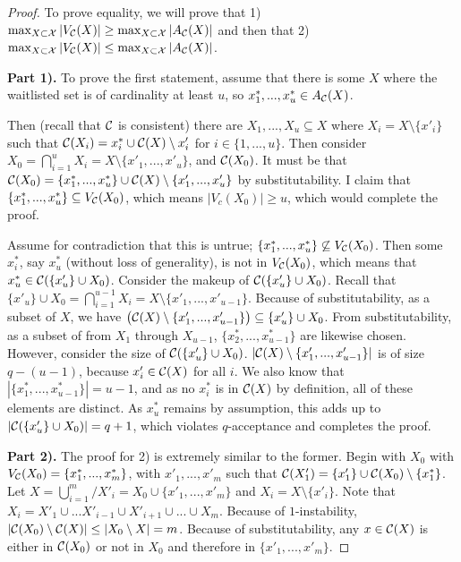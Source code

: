 \begin{proof}
To prove equality, we will prove that 1) $\max_{X\subset \mathcal{X}} \left| V_{\mathcal{C}}(X)\right| \geq \max_{X\subset \mathcal{X}} \left| A_{\mathcal{C}}(X)\right|$ and then that 2) $\max_{X\subset \mathcal{X}} \left| V_{\mathcal{C}}(X)\right| \leq  \max_{X\subset \mathcal{X}} \left| A_{\mathcal{C}}(X)\right|$.

\textbf{Part 1).}
To prove the first statement, assume that there is some $X$ where the waitlisted set is of cardinality at least $u$, so $x^*_1, ..., x^*_u \in A_{\mathcal{C}}(X)$.

Then (recall that $\mathcal{C}$ is consistent) there are $X_1, ..., X_u \subseteq X$ where $X_i = X \setminus \{x'_i\}$ such that $\mathcal{C}(X_i) = x^*_i \cup \mathcal{C}(X) \setminus x'_i$ for $i \in \{1, ..., u\}$. Then consider $X_0 = \bigcap_{i=1}^u X_i = X \setminus \{x'_1, ..., x'_u\}$, and $\mathcal{C}(X_0)$. It must be that $\mathcal{C}(X_0) = \{x^*_1, ..., x^*_u\} \cup \mathcal{C}(X) \setminus \{x'_1, ..., x'_u\}$ by substitutability. I claim that $\{x^*_1, ..., x^*_u\} \subseteq V_{\mathcal{C}}(X_0)$, which means $|V_c(X_0)| \geq u$, which would complete the proof.

Assume for contradiction that this is untrue; $\{x^*_1, ..., x^*_u\} \not\subseteq V_{\mathcal{C}}(X_0)$. Then some $x^*_i$, say $x^*_u$ (without loss of generality), is not in $V_{\mathcal{C}}(X_0)$, which means that $x^*_u \in \mathcal{C}(\{x'_u\} \cup X_0)$.
Consider the makeup of $\mathcal{C}(\{x'_u\} \cup X_0)$. Recall that $\{x'_u\} \cup X_0 = \bigcap_{i=1}^{u-1} X_i = X \setminus \{x'_1, ..., x'_{u-1}\}$. Because of substitutability, as a subset of $X$, we have $\left(\mathcal{C}(X) \setminus \{x'_1, ..., x'_{u-1}\}\right) \subseteq \{x'_u\} \cup X_0$. From substitutability, as a subset of from $X_1$ through $X_{u-1}$, $\{x^*_2, ..., x^*_{u-1}\}$ are likewise chosen.
However, consider the size of $\mathcal{C}(\{x'_u\} \cup X_0)$. $|\mathcal{C}(X) \setminus \{x'_1, ..., x'_{u-1}\}|$ is of size $q-(u-1)$, because $x'_i \in \mathcal{C}(X)$ for all $i$. We also know that $|\{x^*_1, ..., x^*_{u-1}\}| = u-1$, and as no  $x^*_i$ is in $\mathcal{C}(X)$ by definition, all of these elements are distinct. As $x^*_u$ remains by assumption, this adds up to $|\mathcal{C}(\{x'_u\} \cup X_0)| = q+1$, which violates $q$-acceptance and completes the proof.

\textbf{Part 2).}
The proof for 2) is extremely similar to the former. Begin with $X_0$ with $V_{\mathcal{C}}(X_0) = \{x^*_1, ..., x^*_m\}$, with $x'_1, ..., x'_m$ such that $\mathcal{C}(X'_1) = \{x'_1\} \cup \mathcal{C}(X_0) \setminus \{x^*_1\}$. Let $X = \bigcup_{i=1}^m /X'_i = X_0 \cup \{x'_1,...,x'_m\}$ and $X_i = X \setminus \{x'_i\}$. Note that $X_i = X'_1 \cup ... X'_{i-1} \cup X'_{i+1} \cup ... \cup X_m$. %
Because of $1$-instability, $|\mathcal{C}(X_0) \setminus \mathcal{C}(X)| \leq |X_0 \setminus X| = m$. Because of substitutability, any $x \in \mathcal{C}(X)$ is either in $\mathcal{C}(X_0)$ or not in $X_0$ and therefore in $\{x'_1, ..., x'_m\}$.


\end{proof}
